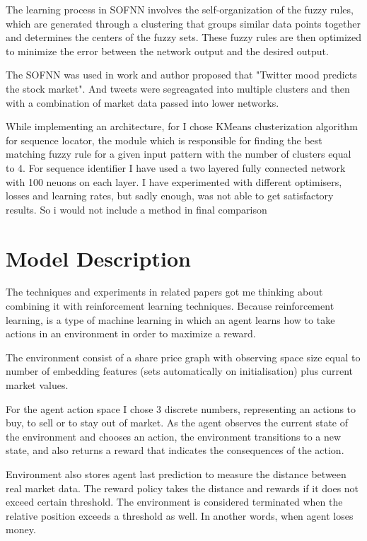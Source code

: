 \documentclass{article}
\begin{document}
The learning process in SOFNN involves the self-organization of the fuzzy rules, which are generated through a clustering that groups similar data points together and determines the centers of the fuzzy sets. 
These fuzzy rules are then optimized to minimize the error between the network output and the desired output.

The SOFNN was used in work \cite{BOLLEN20111} and author proposed that "Twitter mood predicts the stock market". And tweets were segreagated into multiple clusters and then with a combination of market data passed into lower networks.

While implementing an architecture, for I chose KMeans clusterization algorithm \cite{Hartigan1979} for sequence locator, the module which is responsible for finding the best matching fuzzy rule for a given input pattern with the number of clusters equal to 4. 
For sequence identifier I have used a two layered fully connected network with 100 neuons on each layer.
I have experimented with different optimisers, losses and learning rates, but sadly enough, was not able to get satisfactory results. So i would not include a method in final comparison


\section{Model Description}
The techniques and experiments in related papers got me thinking about combining it with reinforcement learning techniques.
Because reinforcement learning, is a type of machine learning in which an agent learns how to take actions in an environment in order to maximize a reward.

The environment consist of a share price graph with observing space size equal to number of embedding features (sets automatically on initialisation) plus current market values.

For the agent action space I chose 3 discrete numbers, representing an actions to buy, to sell or to stay out of market.
As the agent observes the current state of the environment and chooses an action, the environment transitions to a new state, and also returns a reward that indicates the consequences of the action. 

Environment also stores agent last prediction to measure the distance between real market data.
The reward policy takes the distance and rewards if it does not exceed certain threshold.
The environment is considered terminated when the relative position exceeds a threshold as well. In another words, when agent loses money.
\end{document}
